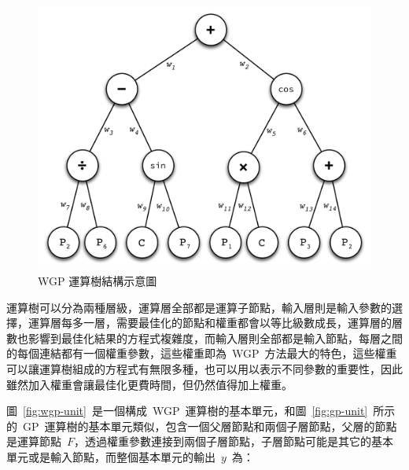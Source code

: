 \begin{figure}[hbtp]
  \begin{center}
    \includegraphics[width=1.0\textwidth]{figures/wgp-sample.pdf}
    \caption{WGP 運算樹結構示意圖} 
    \label{fig:WGP-sample}
  \end{center}
\end{figure}


運算樹可以分為兩種層級，運算層全部都是運算子節點，輸入層則是輸入參數的選擇，運算層每多一層，需要最佳化的節點和權重都會以等比級數成長，運算層的層數也影響到最佳化結果的方程式複雜度，而輸入層則全部都是輸入節點，每層之間的每個連結都有一個權重參數，這些權重即為~WGP~方法最大的特色，這些權重可以讓運算樹組成的方程式有無限多種，也可以用以表示不同參數的重要性，因此雖然加入權重會讓最佳化更費時間，但仍然值得加上權重。

圖~\ref{fig:wgp-unit}~是一個構成~WGP~運算樹的基本單元，和圖~\ref{fig:gp-unit}~所示的~GP~運算樹的基本單元類似，包含一個父層節點和兩個子層節點，父層的節點是運算節點~$F$，透過權重參數連接到兩個子層節點，子層節點可能是其它的基本單元或是輸入節點，而整個基本單元的輸出~$y$~為：

